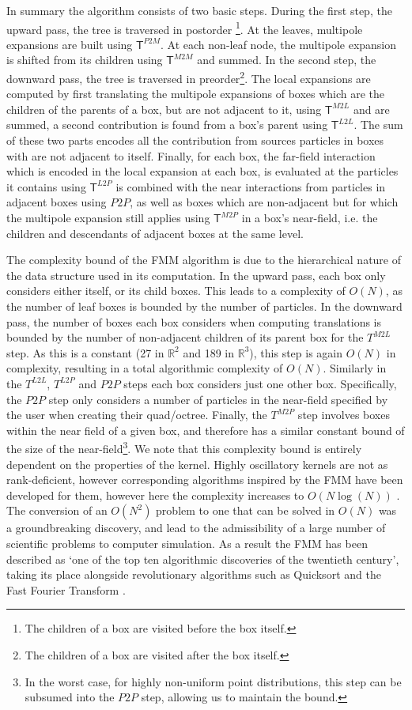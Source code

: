 In summary the algorithm consists of two basic steps. During the first step, the upward pass, the tree is traversed in postorder \footnote{The children of a box are visited before the box itself.}. At the leaves, multipole expansions are built using $\mathsf{T}^{P2M}$. At each non-leaf node, the multipole expansion is shifted from its children using $\mathsf{T}^{M2M}$ and summed. In the second step, the downward pass, the tree is traversed in preorder\footnote{The children of a box are visited after the box itself.}. The local expansions are computed by first translating the multipole expansions of boxes which are the children of the parents of a box, but are not adjacent to it, using $\mathsf{T}^{M2L}$ and are summed, a second contribution is found from a box's parent using $\mathsf{T}^{L2L}$. The sum of these two parts encodes all the contribution from sources particles in boxes with are not adjacent to itself. Finally, for each box, the far-field interaction which is encoded in the local expansion at each box, is evaluated at the particles it contains using $\mathsf{T}^{L2P}$ is combined with the near interactions from particles in adjacent boxes using $P2P$, as well as boxes which are non-adjacent but for which the multipole expansion still applies using $\mathsf{T}^{M2P}$ in a box's near-field, i.e. the children and descendants of adjacent boxes at the same level.

The complexity bound of the FMM algorithm is due to the hierarchical nature of the data structure used in its computation. In the upward pass, each box only considers either itself, or its child boxes. This leads to a complexity of $O(N)$, as the number of leaf boxes is bounded by the number of particles. In the downward pass, the number of boxes each box considers when computing translations is bounded by the number of non-adjacent children of its parent box for the $T^{M2L}$ step. As this is a constant (27 in $\mathbb{R}^2$ and 189 in $\mathbb{R}^3$), this step is again $O(N)$ in complexity, resulting in a total algorithmic complexity of $O(N)$. Similarly in the $T^{L2L}$, $T^{L2P}$ and $P2P$ steps each box considers just one other box. Specifically, the $P2P$ step only considers a number of particles in the near-field specified by the user when creating their quad/octree. Finally, the $T^{M2P}$ step involves boxes within the near field of a given box, and therefore has a similar constant bound of the size of the near-field\footnote{In the worst case, for highly non-uniform point distributions, this step can be subsumed into the $P2P$ step, allowing us to maintain the bound.}. We note that this complexity bound is entirely dependent on the properties of the kernel. Highly oscillatory kernels are not as rank-deficient, however corresponding algorithms inspired by the FMM have been developed for them, however here the complexity increases to $O(N \log (N) )$ \cite{messner2012fast}. The conversion of an $O(N^2)$ problem to one that can be solved in $O(N)$ was a groundbreaking discovery, and lead to the admissibility of a large number of scientific problems to computer simulation. As a result the FMM has been described as `one of the top ten algorithmic discoveries of the twentieth century', taking its place alongside revolutionary algorithms such as Quicksort and the Fast Fourier Transform \cite{cipra2000best}.